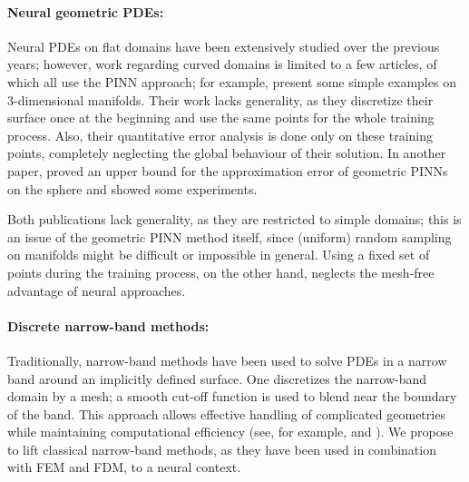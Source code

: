 \documentclass[draft,12pt,openany]{book}
\theoremstyle{plainnormal}
\theoremstyle{remark}
\begin{document}
\paragraph{Neural geometric PDEs:}
Neural PDEs on flat domains have been extensively studied over the previous years; however, work regarding curved domains is limited to a few articles, of which all use the PINN approach; for example, \cite{tangfu} present some simple examples on 3-dimensional manifolds. Their work lacks generality, as they discretize their surface once at the beginning and use the same points for the whole training process. Also, their quantitative error analysis is done only on these training points, completely neglecting the global behaviour of their solution. In another paper, \cite{lei2024solvingpdesspheresphysicsinformed} proved an upper bound for the approximation error of geometric PINNs on the sphere and showed some experiments.\par
Both publications lack generality, as they are restricted to simple domains; this is an issue of the geometric PINN method itself, since (uniform) random sampling on manifolds might be difficult or impossible in general. Using a fixed set of points during the training process, on the other hand, neglects the mesh-free advantage of neural approaches. 
\paragraph{Discrete narrow-band methods:}
Traditionally, narrow-band methods have been used to solve PDEs in a narrow band around an implicitly defined surface. One discretizes the narrow-band domain by a mesh; a smooth cut-off function is used to blend near the boundary of the band. This approach allows effective handling of complicated geometries while maintaining computational efficiency (see, for example, \cite{deckelnick} and \cite{neRU}). We propose to lift classical narrow-band methods, as they have been used in combination with FEM and FDM, to a neural context. 
\end{document}
